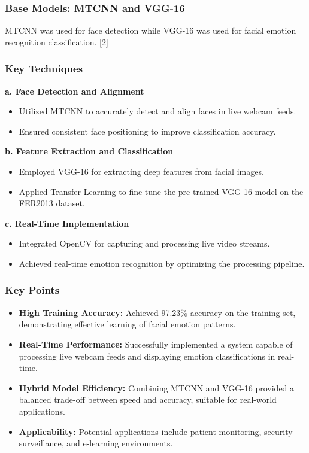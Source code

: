 \documentclass{article}
\begin{document}
\subsubsection*{Base Models: MTCNN and VGG-16}
MTCNN was used for face detection while VGG-16 was used for facial emotion recognition classification. [2]

\subsubsection*{Key Techniques}
\textbf{a. Face Detection and Alignment}
\begin{itemize}
    \item Utilized MTCNN to accurately detect and align faces in live webcam feeds.
    \item Ensured consistent face positioning to improve classification accuracy.
\end{itemize}

\textbf{b. Feature Extraction and Classification}
\begin{itemize}
    \item Employed VGG-16 for extracting deep features from facial images.
    \item Applied Transfer Learning to fine-tune the pre-trained VGG-16 model on the FER2013 dataset.
\end{itemize}

\textbf{c. Real-Time Implementation}
\begin{itemize}
    \item Integrated OpenCV for capturing and processing live video streams.
    \item Achieved real-time emotion recognition by optimizing the processing pipeline.
\end{itemize}

\subsubsection*{Key Points}
\begin{itemize}
    \item \textbf{High Training Accuracy:} Achieved 97.23\% accuracy on the training set, demonstrating effective learning of facial emotion patterns.
    \item \textbf{Real-Time Performance:} Successfully implemented a system capable of processing live webcam feeds and displaying emotion classifications in real-time.
    \item \textbf{Hybrid Model Efficiency:} Combining MTCNN and VGG-16 provided a balanced trade-off between speed and accuracy, suitable for real-world applications.
    \item \textbf{Applicability:} Potential applications include patient monitoring, security surveillance, and e-learning environments.
\end{itemize}
\end{document}
